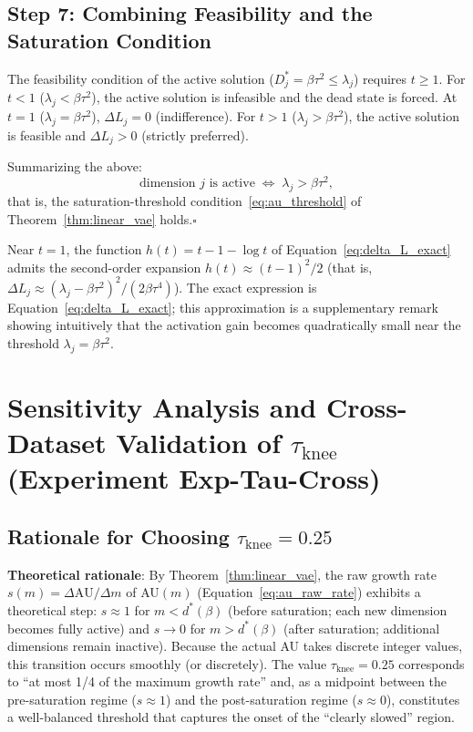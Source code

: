 \documentclass[make,article,submit,pdftex,moreauthors]{Definitions/mdpi}
\begin{document}
\subsection*{Step 7: Combining Feasibility and the Saturation Condition}

The feasibility condition of the active solution
($D_j^* = \beta\tau^2 \leq \lambda_j$) requires $t \geq 1$.
For $t < 1$ ($\lambda_j < \beta\tau^2$), the active solution is infeasible and
the dead state is forced.
At $t = 1$ ($\lambda_j = \beta\tau^2$), $\Delta L_j = 0$ (indifference).
For $t > 1$ ($\lambda_j > \beta\tau^2$), the active solution is feasible and
$\Delta L_j > 0$ (strictly preferred).

Summarizing the above:
\begin{equation}
  \text{dimension }j\text{ is active} \;\Longleftrightarrow\; \lambda_j > \beta\tau^2,
\end{equation}
that is, the saturation-threshold condition~\eqref{eq:au_threshold} of
Theorem~\ref{thm:linear_vae} holds.\hfill$\square$

\begin{Remark}
Near $t = 1$, the function $h(t) = t - 1 - \log t$ of
Equation~\eqref{eq:delta_L_exact} admits the second-order expansion
$h(t) \approx (t-1)^2/2$
(that is, $\Delta L_j \approx (\lambda_j - \beta\tau^2)^2/(2\beta\tau^4)$).
The exact expression is Equation~\eqref{eq:delta_L_exact}; this approximation is
a supplementary remark showing intuitively that the activation gain becomes
quadratically small near the threshold $\lambda_j = \beta\tau^2$.
\end{Remark}

\section[\appendixname~\thesection]{Sensitivity Analysis and Cross-Dataset Validation of $\tau_{\mathrm{knee}}$ (Experiment Exp-Tau-Cross)}\label{app:tau_knee}

\subsection*{Rationale for Choosing $\tau_{\mathrm{knee}} = 0.25$}

\textbf{Theoretical rationale}:
By Theorem~\ref{thm:linear_vae}, the raw growth rate
$s(m) = \Delta\mathrm{AU}/\Delta m$ of AU$(m)$
(Equation~\eqref{eq:au_raw_rate}) exhibits a theoretical step:
$s \approx 1$ for $m < d^*(\beta)$ (before saturation; each new dimension becomes
fully active) and $s \to 0$ for $m > d^*(\beta)$ (after saturation; additional
dimensions remain inactive).
Because the actual AU takes discrete integer values, this transition occurs
smoothly (or discretely).
The value $\tau_{\mathrm{knee}} = 0.25$ corresponds to ``at most 1/4 of the
maximum growth rate'' and, as a midpoint between the pre-saturation regime
($s \approx 1$) and the post-saturation regime ($s \approx 0$), constitutes a
well-balanced threshold that captures the onset of the ``clearly slowed''
region.
\end{document}
